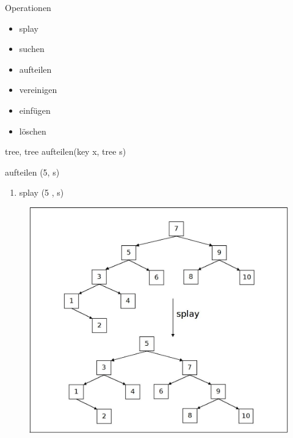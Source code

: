 \documentclass[11pt]{beamer}
\begin{document}
		\begin{frame}{Operationen}
		
		\begin{itemize}
			
			\item \color {gray} splay
			\item suchen
			\item \color {black} aufteilen
			\item \color {gray} vereinigen
			\item einfügen
			\item löschen
		\end{itemize}
	\end{frame}		


	\begin{frame}{tree, tree aufteilen(key x, tree s)}
	\begin{block}{aufteilen (5, s)}
		\begin{enumerate}
			\item splay (5 ,  s)
			
			
		\end{enumerate}
	\end{block}	
	\pause
	\begin{figure}[h]
		\centering
		\includegraphics[height=0.50\textwidth]{"bilder/aufteilen"}	
	\end{figure}
	
	\end{frame}	
\end{document}

